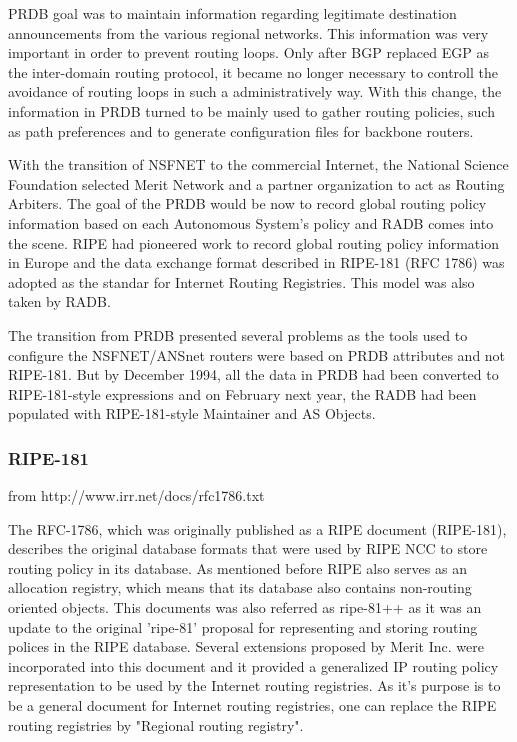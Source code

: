 \documentclass[11pt]{report}
\begin{document}
PRDB goal was to maintain information regarding legitimate destination announcements from the various regional networks. This information was very important in order to prevent routing loops. Only after BGP replaced EGP as the inter-domain routing protocol, it became no longer necessary to controll the avoidance of routing loops in such a administratively way. With this change, the information in PRDB turned to be mainly used to gather routing policies, such as path preferences and to generate configuration files for backbone routers.

With the transition of NSFNET to the commercial Internet, the National Science Foundation selected Merit Network and a partner organization to act as Routing Arbiters. The goal of the PRDB would be now to record global routing policy information based on each Autonomous System's policy and RADB comes into the scene. RIPE had pioneered work to record global routing policy information in Europe and the data exchange format described in RIPE-181 (RFC 1786) was adopted as the standar for Internet Routing Registries. This model was also taken by RADB. 

The transition from PRDB presented several problems as the tools used to configure the NSFNET/ANSnet routers were based on PRDB attributes and not RIPE-181. But by December 1994, all the data in PRDB had been converted to RIPE-181-style expressions and on February next year, the RADB had been populated with RIPE-181-style Maintainer and AS Objects. 

\subsubsection{RIPE-181}
from http://www.irr.net/docs/rfc1786.txt


The RFC-1786, which was originally published as a RIPE document (RIPE-181), describes the original database formats that were used by RIPE NCC to store routing policy in its database. As mentioned before RIPE also serves as an allocation registry, which means that its database also contains non-routing oriented objects. 
This documents was also referred as ripe-81++ as it was an update to the original 'ripe-81' proposal for representing and storing routing polices in the RIPE database. Several extensions proposed by Merit Inc. were incorporated into this document and it provided a generalized IP routing policy representation to be used by the Internet routing registries. As it's purpose is to be a general document for Internet routing registries, one can replace the RIPE routing registries by "Regional routing registry".
\end{document}
